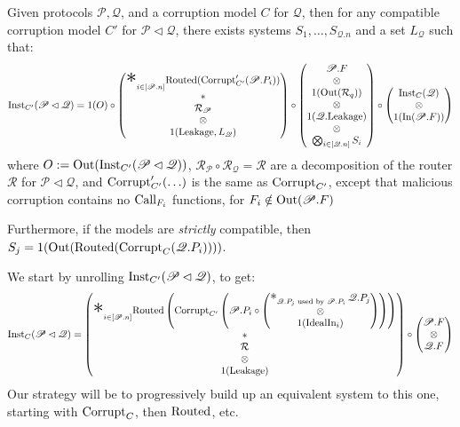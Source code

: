 \begin{theorem}
  \label{thm:horizontal_breakdown}
  Given protocols $\mathscr{P}, \mathscr{Q}$, and a corruption
  model $C$ for $\mathscr{Q}$, then for any compatible corruption
  model $C'$ for $\mathscr{P} \lhd \mathscr{Q}$, there exists
  systems $S_1, \ldots, S_{\mathscr{Q}.n}$ and a set $L_{\mathscr{Q}}$ such that:
  $$
  \tx{Inst}_{C'}(\mathscr{P} \lhd \mathscr{Q}) =
  1(O)\circ
  \begin{pmatrix}
    {\displaystyle \bigast}_{i \in [\mathscr{P}.n]} \tx{Routed}(\tx{Corrupt}'_{C'}(\mathscr{P}.P_i))
    \cr
    *\cr
    \mathcal{R}_{\mathscr{P}}\cr
    \otimes\cr
    1(\tx{Leakage}, L_{\mathscr{Q}})
  \end{pmatrix}
  \circ
  \begin{pmatrix}
    \mathscr{P}.F\cr
    \otimes\cr
    1(\tx{Out}(\mathcal{R}_q))\cr
    \otimes\cr
    1(\mathscr{Q}.\tx{Leakage})\cr
    \otimes\cr
    \bigotimes_{i \in [\mathscr{Q}.n]} S_i\cr
  \end{pmatrix}
  \circ
  \begin{pmatrix}
  \tx{Inst}_C(\mathscr{Q})\cr
  \otimes\cr
  1(\tx{In}(\mathscr{P}.F))
  \end{pmatrix}
  $$
  where $O := \text{Out}(\text{Inst}_{C'}(\mathscr{P} \lhd \mathscr{Q}))$,
  $\mathcal{R}_{\mathscr{P}} \circ \mathcal{R}_{\mathscr{Q}} = \mathcal{R}$
  are a decomposition of the router $\mathcal{R}$ for $\mathscr{P} \lhd \mathscr{Q}$,
  and $\text{Corrupt}'_{C'}(\ldots)$ is the same as $\text{Corrupt}_{C'}$,
  except that malicious corruption contains no $\text{Call}_{F_i}$ functions,
  for $F_i \notin \text{Out}(\mathscr{P}.F)$

  Furthermore, if the models are \emph{strictly} compatible,
  then $S_j = 1(\text{Out}(\text{Routed}(\text{Corrupt}_C(\mathscr{Q}.P_i))))$.

 We start by unrolling $\text{Inst}_{C'}(\mathscr{P} \lhd \mathscr{Q})$,
to get:
\[
\tx{Inst}_C(\mathscr{P} \lhd \mathscr{Q}) =
  \begin{pmatrix}
    {\displaystyle \bigast}_{i \in [\mathscr{P}.n]} \tx{Routed}\left(\tx{Corrupt}_{C'}\left(\mathscr{P}.P_i \circ 
        
    \begin{pmatrix}
    \bigast_{\mathscr{Q}.P_j \tx{ used by } \mathscr{P}.P_i} \mathscr{Q}.P_j\cr
    \otimes\cr
    1(\tx{IdealIn}_i)
    \end{pmatrix}
    \right)\right)\cr
    *\cr
    \mathcal{R}\cr
    \otimes\cr
    1(\tx{Leakage})
  \end{pmatrix}
  \circ \begin{pmatrix}
    \mathscr{P}.F\cr
    \otimes \cr
    \mathscr{Q}.F
  \end{pmatrix}
\]
Our strategy will be to progressively build up an equivalent system
to this one, starting with $\text{Corrupt}_C$, then $\text{Routed}$, etc.


\end{theorem}
